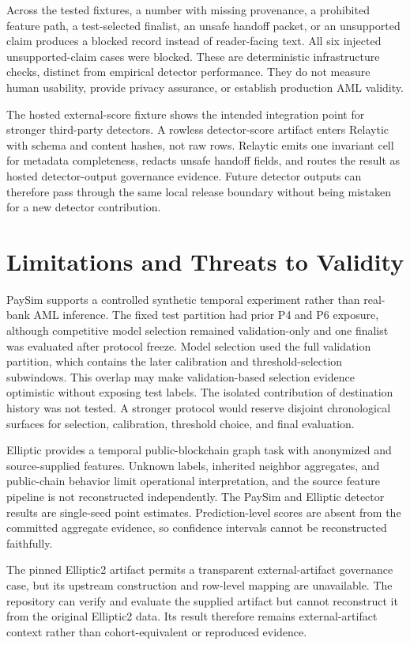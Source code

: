 \documentclass[11pt]{article}
\begin{document}
Across the tested fixtures, a number with missing provenance, a prohibited feature path, a test-selected finalist, an unsafe handoff packet, or an unsupported claim produces a blocked record instead of reader-facing text. All six injected unsupported-claim cases were blocked. These are deterministic infrastructure checks, distinct from empirical detector performance. They do not measure human usability, provide privacy assurance, or establish production AML validity.

The hosted external-score fixture shows the intended integration point for stronger third-party detectors. A rowless detector-score artifact enters Relaytic with schema and content hashes, not raw rows. Relaytic emits one invariant cell for metadata completeness, redacts unsafe handoff fields, and routes the result as hosted detector-output governance evidence. Future detector outputs can therefore pass through the same local release boundary without being mistaken for a new detector contribution.

\section{Limitations and Threats to Validity}

PaySim supports a controlled synthetic temporal experiment rather than real-bank AML inference. The fixed test partition had prior P4 and P6 exposure, although competitive model selection remained validation-only and one finalist was evaluated after protocol freeze. Model selection used the full validation partition, which contains the later calibration and threshold-selection subwindows. This overlap may make validation-based selection evidence optimistic without exposing test labels. The isolated contribution of destination history was not tested. A stronger protocol would reserve disjoint chronological surfaces for selection, calibration, threshold choice, and final evaluation.

Elliptic provides a temporal public-blockchain graph task with anonymized and source-supplied features. Unknown labels, inherited neighbor aggregates, and public-chain behavior limit operational interpretation, and the source feature pipeline is not reconstructed independently. The PaySim and Elliptic detector results are single-seed point estimates. Prediction-level scores are absent from the committed aggregate evidence, so confidence intervals cannot be reconstructed faithfully.

The pinned \mbox{Elliptic2} artifact permits a transparent external-artifact governance case, but its upstream construction and row-level mapping are unavailable. The repository can verify and evaluate the supplied artifact but cannot reconstruct it from the original \mbox{Elliptic2} data. Its result therefore remains external-artifact context rather than cohort-equivalent or reproduced evidence.
\end{document}
